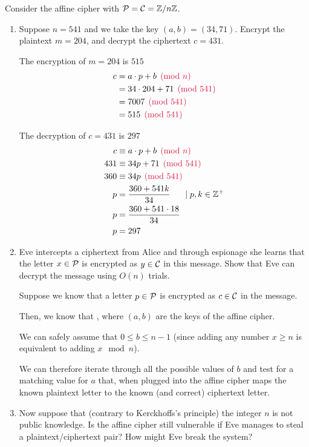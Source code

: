 \begin{problem}
Consider the affine cipher with $\mathcal{P}=\mathcal{C}=\mathbb{Z}/n\mathbb{Z}$.  
\begin{enumerate}\renewcommand{\itemsep}{3mm}
\item Suppose $n=541$ and we take the key $(a,b)=(34,71)$.  Encrypt the plaintext $m=204$, and decrypt the ciphertext $c=431$.
\begin{Answer}

\noindent
The encryption of $m=204$ is $515$
\begin{align*}
  c &= a \cdot p + b \crim{\pmod n}\\
  &= 34 \cdot 204 + 71 \crim{\pmod{541}}\\
  &= 7007 \crim{\pmod{541}}\\
  &= 515 \crim{\pmod{541}}
\end{align*}

\noindent
The decryption of $c=431$ is $297$
\begin{align*}
  c &\equiv a \cdot p + b \crim{\pmod n}\\
  431 &\equiv 34p + 71 \crim{\pmod{541}}\\
  360 &\equiv 34p \crim{\pmod{541}}\\
  p &= \frac{360 + 541k}{34}  \hspace{15pt}\mid p,k \in \Z^+\\
  p &= \frac{360 + 541\cdot 18}{34}\\
  p &= 297
\end{align*}

\end{Answer}

\item Eve intercepts a ciphertext from Alice
and through espionage she learns that the letter
$x \in \mathcal{P}$ is encrypted as $y \in \mathcal{C}$ in this message.
Show that Eve can decrypt the message using $O(n)$ trials.  
\begin{Answer}

Suppose we know that a letter $p \in \mathcal{P}$ is encrypted as
$c \in \mathcal{C}$ in the message.

\noindent
Then, we know that ,
where $(a, b)$ are the keys of the affine cipher.

\noindent
We can safely assume that $0 \le b \le n-1$ 
(since adding any number $x \ge n$ is equivalent to adding
$x \mod n$).

\noindent
We can therefore iterate through all the possible values of $b$ and
test for a matching value for $a$ that, when plugged into the affine cipher
maps the known plaintext letter to the known (and correct) ciphertext letter.

\end{Answer}
\item Now suppose that (contrary to Kerckhoffs's principle) the integer $n$ is not public knowledge.  Is the affine cipher still vulnerable if Eve manages to steal a plaintext/ciphertext pair?  How might Eve break the system?
\begin{Answer}
  
\end{Answer}
\end{enumerate}
\end{problem}

